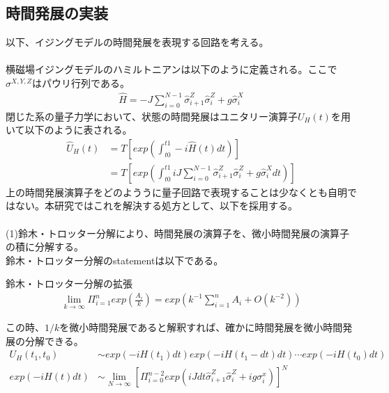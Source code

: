 \documentclass[a4paper,10.5pt]{article}
\numberwithin{equation}{section}
\begin{document}
\subsection{時間発展の実装}
以下、イジングモデルの時間発展を表現する回路を考える。\\
\\
横磁場イジングモデルのハミルトニアンは以下のように定義される。ここで$\sigma^{X,Y,Z}$はパウリ行列である。
   \begin{equation}\begin{split}
     \hat{H} = -J\sum_{i=0}^{N-1}\hat{\sigma}_{i+1}^{Z} \hat{\sigma}_{i}^{Z}
     +g \hat{\sigma}_{i}^{X}
 \end{split} \end{equation}
閉じた系の量子力学において、状態の時間発展はユニタリー演算子$U_{H}(t)$を用いて以下のように表される。
\begin{equation}\begin{split}
    \hat{U}_{H}(t) &= T[exp(\int_{t0}^{t1} -i \hat{H}(t) dt )]\\
    &=T[exp(\int_{t0}^{t1} iJ\sum_{i=0}^{N-1}\hat{\sigma}_{i+1}^{Z} \hat{\sigma}_{i}^{Z}
     +g \hat{\sigma}_{i}^{X} dt )]
\end{split} \end{equation}
上の時間発展演算子をどのよううに量子回路で表現することは少なくとも自明ではない。本研究ではこれを解決する処方として、以下を採用する。\\
\\
(1)鈴木・トロッター分解により、時間発展の演算子を、微小時間発展の演算子の積に分解する。\\
鈴木・トロッター分解のstatementは以下である。
\begin{theorembox}{鈴木・トロッター分解の拡張}
\begin{equation}\begin{split}
     \lim_{k \to \infty} \Pi_{i=1}^{n}exp(\frac{A_{i}}{k}) 
     = exp(k^{-1}\sum_{i=1}^{n}A_{i}+ O(k^{-2})) 
\end{split} \end{equation}
\end{theorembox}
この時、$1/k$を微小時間発展であると解釈すれば、確かに時間発展を微小時間発展の分解できる。\\
\begin{equation}\begin{split}
     U_{H}(t_{1},t_{0}) &\sim exp(-iH(t_{1})dt)exp(-iH(t_{1}-dt)dt)\cdots exp(-iH(t_{0})dt) \\
     exp(-iH(t)dt) &\sim \lim_{N \to \infty} [\Pi_{i=0}^{n-2}
    exp(iJdt\hat{\sigma}_{i+1}^{Z} \hat{\sigma}_{i}^{Z}+ig\sigma_{i}^{x})]^{N}
 \end{split} \end{equation}
\end{document}
